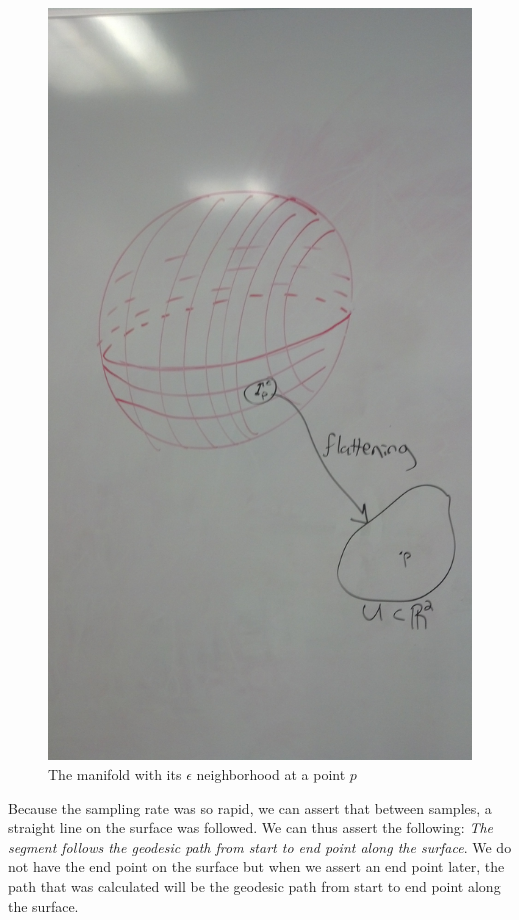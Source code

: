 \documentclass[conference]{acmsiggraph}
\begin{document}
\begin{figure}[ht]
\centering
\includegraphics[width=\columnwidth]{manifolddiagram.jpg}
\caption{The manifold with its $\epsilon$ neighborhood at a point $p$}
\label{manifolddiagram}
\end{figure}
Because the sampling rate was so rapid, we can assert that between samples, a straight line on the surface was followed. We can thus assert the following: {\it The segment follows the geodesic path from start to end point along the surface}. We do not have the end point on the surface but when we assert an end point later, the path that was calculated will be the geodesic path from start to end point along the surface. \\
\end{document}
